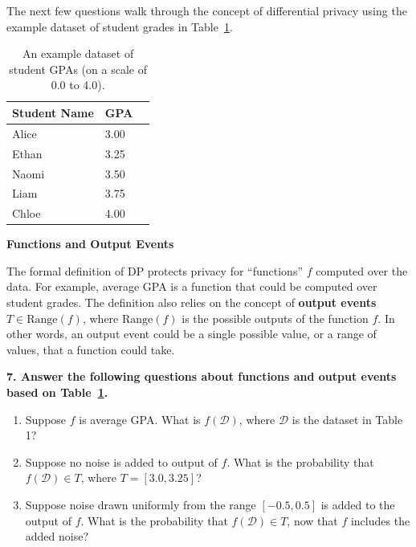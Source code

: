 \documentclass{article}
\begin{document}
The next few questions walk through the concept of differential privacy using the example dataset of student grades in Table~\ref{tbl:dataset}.

\begin{table}[h!]
    \centering    
    \begin{tabular}{lll}
        \toprule
        \textbf{Student Name} & \textbf{GPA} \\
        \midrule
        Alice             & 3.00 \\
        Ethan             & 3.25 \\
        Naomi             & 3.50 \\
        Liam              & 3.75 \\
        Chloe             & 4.00 \\
        \bottomrule
    \end{tabular}
    \caption{An example dataset of student GPAs (on a scale of 0.0 to 4.0).}
    \label{tbl:dataset}
\end{table}

\textbf{Functions and Output Events}

The formal definition of DP protects privacy for ``functions'' $f$ computed over the data. For example, average GPA is a function that could be computed over student grades. The definition also relies on the concept of \textbf{output events} $T \in \text{Range}(f)$, where $\text{Range}(f)$ is the possible outputs of the function $f$. In other words, an output event could be a single possible value, or a range of values, that a function could take. 

\textbf{7. Answer the following questions about functions and output events based on Table~\ref{tbl:dataset}.}
\begin{enumerate}[label=\Alph*.]
\item Suppose $f$ is average GPA. What is $f(\mathcal{D})$, where $\mathcal{D}$ is the dataset in Table 1?
\item Suppose no noise is added to output of $f$. What is the probability that $f(\mathcal{D}) \in T$, where $T = [3.0, 3.25]$?
\item Suppose noise drawn uniformly from the range $[-0.5,0.5]$ is added to the output of $f$. What is the probability that $f(\mathcal{D}) \in T$, now that $f$ includes the added noise?
\end{enumerate}
\end{document}
